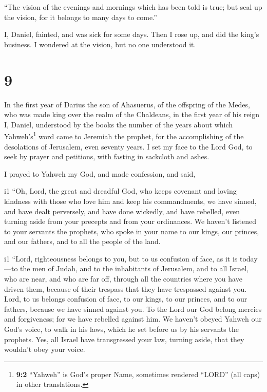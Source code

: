  ``The vision of the evenings and mornings which has been
told is true; but seal up the vision, for it belongs to many days to
come.''

 I, Daniel, fainted, and was sick for some days. Then I
rose up, and did the king's business. I wondered at the vision, but no
one understood it.

\hypertarget{section-8}{%
\section{9}\label{section-8}}

 In the first year of Darius the son of Ahasuerus, of the
offspring of the Medes, who was made king over the realm of the
Chaldeans,  in the first year of his reign I, Daniel,
understood by the books the number of the years about which
Yahweh's\footnote{\textbf{9:2} ``Yahweh'' is God's proper Name,
  sometimes rendered ``LORD'' (all caps) in other translations.} word
came to Jeremiah the prophet, for the accomplishing of the desolations
of Jerusalem, even seventy years.  I set my face to the
Lord God, to seek by prayer and petitions, with fasting in sackcloth and
ashes.

 I prayed to Yahweh my God, and made confession, and said,

i1 ``Oh, Lord, the great and dreadful God, who keeps covenant and loving
kindness with those who love him and keep his commandments,
 we have sinned, and have dealt perversely, and have done
wickedly, and have rebelled, even turning aside from your precepts and
from your ordinances.  We haven't listened to your
servants the prophets, who spoke in your name to our kings, our princes,
and our fathers, and to all the people of the land.

i1  ``Lord, righteousness belongs to you, but to us
confusion of face, as it is today---to the men of Judah, and to the
inhabitants of Jerusalem, and to all Israel, who are near, and who are
far off, through all the countries where you have driven them, because
of their trespass that they have trespassed against you. 
Lord, to us belongs confusion of face, to our kings, to our princes, and
to our fathers, because we have sinned against you.  To
the Lord our God belong mercies and forgiveness; for we have rebelled
against him.  We haven't obeyed Yahweh our God's voice,
to walk in his laws, which he set before us by his servants the
prophets.  Yes, all Israel have transgressed your law,
turning aside, that they wouldn't obey your voice.

